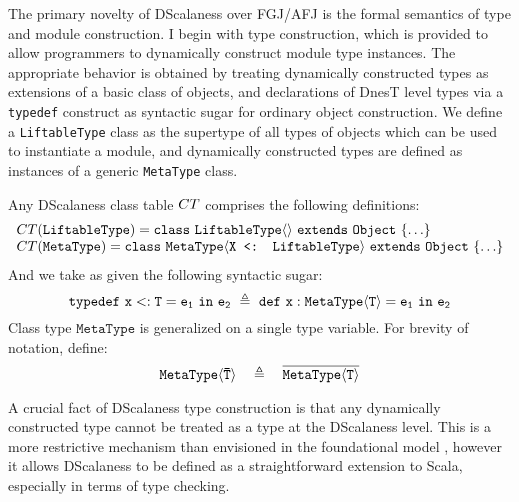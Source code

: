 The primary novelty of DScalaness over FGJ/AFJ is the formal semantics of type and module
construction. I begin with type construction, which is provided to allow programmers to
dynamically construct module type instances. The appropriate behavior is obtained by treating
dynamically constructed types as extensions of a basic class of objects, and declarations of
DnesT level types via a \texttt{typedef} construct as syntactic sugar for ordinary object
construction. We define a \texttt{LiftableType} class as the supertype of all types of objects
which can be used to instantiate a module, and dynamically constructed types are defined as
instances of a generic \texttt{MetaType} class.
\begin{definition}
Any DScalaness class table ${CT}$ comprises the following definitions:
$$
\begin{array}{l}
{CT}(\texttt{LiftableType}) = \mathtt{class\ \texttt{LiftableType}\langle \rangle\ extends\ Object\ \{\ldots \}}\\
{CT}(\texttt{MetaType}) = \mathtt{class\ \texttt{MetaType}\langle \texttt{X <: LiftableType}\rangle\ extends\ Object\ \{ \ldots  \}}
\end{array}
$$
And we take as given the following syntactic sugar:
$$
\jtlet{x}{T}{e_1}{e_2}\ \defeq\ \jdef{x}{\jinst{MetaType}{T}}{e_1}{e_2}
$$
Class type $\texttt{MetaType}$ is generalized on a single type variable. For brevity of
notation, define:
$$
\mathtt{\texttt{MetaType}\langle {\ensuremath{\mathtt{\bar{T}}}} \rangle}\quad \triangleq \quad \overline{\mathtt{MetaType\langle T \rangle}}
$$
\end{definition}
A crucial fact of DScalaness type construction is that any dynamically constructed type cannot be
treated as a type at the DScalaness level. This is a more restrictive mechanism than envisioned
in the foundational model \cite{FramedML,FramedMLworkshop}, however it allows DScalaness to be
defined as a straightforward extension to Scala, especially in terms of type checking.

